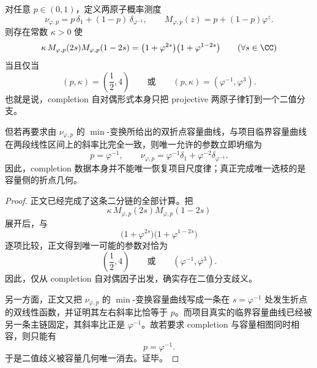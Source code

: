 \begin{theorem}\label{thm:conclusion-balanced-twoatom-completion-capacity-branch-selection}
对任意 \(p\in(0,1)\)，定义两原子概率测度
\[
\nu_{\varphi,p}=p\,\delta_1+(1-p)\,\delta_{\varphi^{-1}},
\qquad
M_{\varphi,p}(z)=p+(1-p)\varphi^z.
\]
则存在常数 \(\kappa>0\) 使
\[
\kappa\,M_{\varphi,p}(2s)M_{\varphi,p}(1-2s)
=
\bigl(1+\varphi^{2s}\bigr)\bigl(1+\varphi^{1-2s}\bigr)
\qquad (\forall s\in\CC)
\]
当且仅当
\[
(p,\kappa)=\left(\frac12,4\right)
\qquad\text{或}\qquad
(p,\kappa)=\left(\varphi^{-1},\varphi^3\right).
\]
也就是说，completion 自对偶形式本身只把 projective 两原子律钉到一个二值分支。

但若再要求由 \(\nu_{\varphi,p}\) 的 \(\min\)-变换所给出的双折点容量曲线，与项目临界容量曲线在两段线性区间上的斜率比完全一致，则唯一允许的参数立即坍缩为
\[
p=\varphi^{-1},
\qquad
\nu_{\varphi,p}=\varphi^{-1}\delta_1+\varphi^{-2}\delta_{\varphi^{-1}}.
\]
因此，completion 数据本身并不能唯一恢复项目尺度律；真正完成唯一选枝的是容量侧的折点几何。
\end{theorem}
\begin{proof}
正文已经完成了这条二分链的全部计算。把
\[
\kappa\,M_{\varphi,p}(2s)M_{\varphi,p}(1-2s)
\]
展开后，与
\[
\bigl(1+\varphi^{2s}\bigr)\bigl(1+\varphi^{1-2s}\bigr)
\]
逐项比较，正文得到唯一可能的参数对恰为
\[
\left(\frac12,4\right)
\qquad\text{或}\qquad
\left(\varphi^{-1},\varphi^3\right).
\]
因此，仅从 completion 自对偶因子出发，确实存在二值分支歧义。

另一方面，正文又把 \(\nu_{\varphi,p}\) 的 \(\min\)-变换容量曲线写成一条在 \(s=\varphi^{-1}\) 处发生折点的双线性函数，并证明其左右斜率比恰等于 \(p\)。而项目真实的临界容量曲线已经被另一条主链固定，其斜率比正是 \(\varphi^{-1}\)。故若要求 completion 与容量相图同时相容，则只能有
\[
p=\varphi^{-1}.
\]
于是二值歧义被容量几何唯一消去。证毕。
\end{proof}

